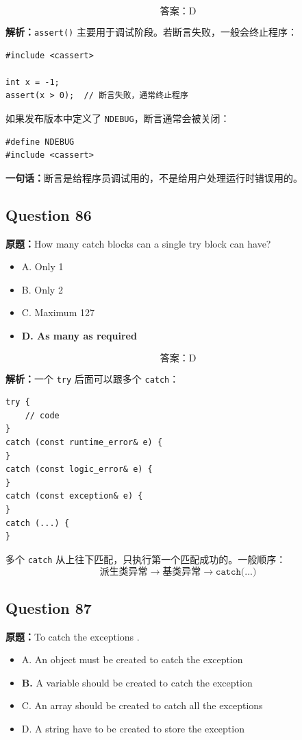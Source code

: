 \documentclass[11pt, a4paper]{article}
\begin{document}
\[
\boxed{\text{答案：D}}
\]

\textbf{解析：}\texttt{assert()} 主要用于调试阶段。若断言失败，一般会终止程序：
\begin{lstlisting}
#include <cassert>

int x = -1;
assert(x > 0);  // 断言失败，通常终止程序
\end{lstlisting}

如果发布版本中定义了 \texttt{NDEBUG}，断言通常会被关闭：
\begin{lstlisting}
#define NDEBUG
#include <cassert>
\end{lstlisting}

\textbf{一句话：}断言是给程序员调试用的，不是给用户处理运行时错误用的。


\subsection*{Question 86}
\textbf{原题：}How many catch blocks can a single try block can have?
\begin{itemize}
    \item A. Only 1
    \item B. Only 2
    \item C. Maximum 127
    \item \textbf{D. As many as required}
\end{itemize}

\[
\boxed{\text{答案：D}}
\]

\textbf{解析：}一个 \texttt{try} 后面可以跟多个 \texttt{catch}：
\begin{lstlisting}
try {
    // code
}
catch (const runtime_error& e) {
}
catch (const logic_error& e) {
}
catch (const exception& e) {
}
catch (...) {
}
\end{lstlisting}

多个 \texttt{catch} 从上往下匹配，只执行第一个匹配成功的。一般顺序：
\[
\text{派生类异常} \to \text{基类异常} \to \texttt{catch(...)}
\]


\subsection*{Question 87}
\textbf{原题：}To catch the exceptions \underline{\hspace{2cm}}.
\begin{itemize}
    \item A. An object must be created to catch the exception
    \item \textbf{B.} A variable should be created to catch the exception
    \item C. An array should be created to catch all the exceptions
    \item D. A string have to be created to store the exception
\end{itemize}
\end{document}
